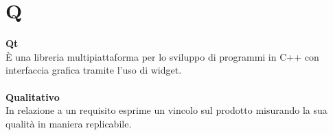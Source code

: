 \section{Q}
\textbf{Qt}\\
È una libreria multipiattaforma per lo sviluppo di programmi in C++ con interfaccia grafica tramite l'uso di widget. \\ \\
\textbf{Qualitativo}\\
In relazione a un requisito esprime un vincolo sul prodotto misurando la sua qualità in maniera replicabile. 
\clearpage